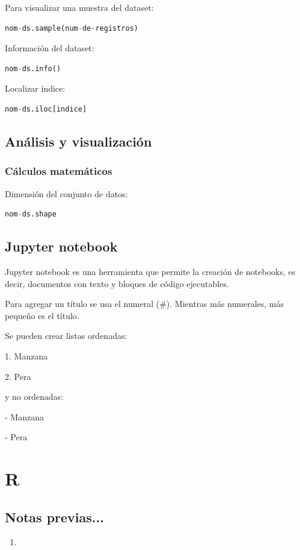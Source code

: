 \documentclass[a4paper, 12pt]{book}
\begin{document}
Para visualizar una muestra del dataset:
\begin{lstlisting}[language=Python]
nom-ds.sample(num-de-registros)
\end{lstlisting}

Información del dataset:
\begin{lstlisting}[language=Python]
nom-ds.info()
\end{lstlisting}

Localizar índice:
\begin{lstlisting}[language=Python]
nom-ds.iloc[indice]
\end{lstlisting}

\section{Análisis y visualización}
\subsection{Cálculos matemáticos}
Dimensión del conjunto de datos:
\begin{lstlisting}[language=Python]
nom-ds.shape
\end{lstlisting}



\section{Jupyter notebook}
Jupyter notebook es una herramienta que permite la creación de notebooks, es decir, documentos con texto y bloques de código ejecutables.

Para agregar un título se usa el numeral ($\#$). Mientras más numerales, más pequeño es el título.

Se pueden crear listas ordenadas:

1. Manzana

2. Pera

y no ordenadas:

- Manzana

- Pera

%
\chapter{R}
\section{Notas previas...}
\begin{enumerate}
\item 
\end{enumerate}
\end{document}
